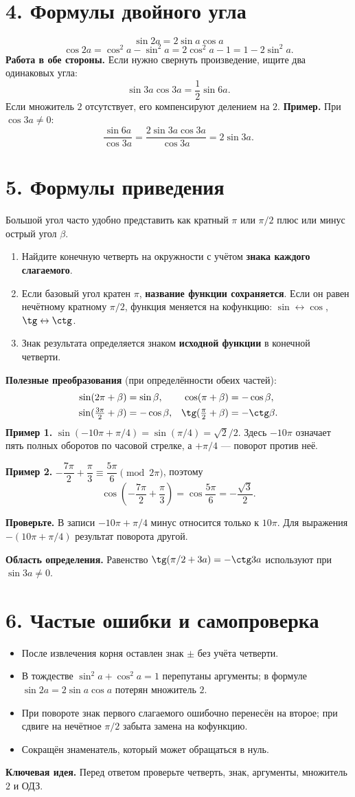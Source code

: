 \documentclass[a4paper,12pt]{article}
\newcommand{\keyidea}[1]{\par\smallskip\noindent\textcolor{darkaccent}{\textbf{Ключевая идея.}} #1\par\smallskip}
\newcommand{\alertline}[1]{\par\smallskip\noindent\textcolor{darkaccent}{\textbf{Проверьте.}} #1\par\smallskip}
\newcommand{\sectionheading}[1]{\section*{\textcolor{darkaccent}{#1}}}
\begin{document}
\sectionheading{4. Формулы двойного угла}
\[
\boxed{\sin2a=2\sin a\cos a}
\]
\[
\boxed{\cos2a=\cos^2a-\sin^2a
=2\cos^2a-1=1-2\sin^2a.}
\]
\textbf{Работа в обе стороны.} Если нужно свернуть произведение, ищите два одинаковых угла:
\[
\sin3a\cos3a=\frac12\sin6a.
\]
Если множитель $2$ отсутствует, его компенсируют делением на $2$.
\textbf{Пример.} При $\cos3a\ne0$:
\[
\frac{\sin6a}{\cos3a}
=\frac{2\sin3a\cos3a}{\cos3a}=2\sin3a.
\]

\sectionheading{5. Формулы приведения}
Большой угол часто удобно представить как кратный $\pi$ или $\pi/2$ плюс
или минус острый угол $\beta$.
\begin{enumerate}
\item Найдите конечную четверть на окружности с учётом \textbf{знака каждого слагаемого}.
\item Если базовый угол кратен $\pi$, \textbf{название функции сохраняется}.
Если он равен нечётному кратному $\pi/2$, функция меняется на кофункцию:
$\sin\leftrightarrow\cos$, $\tg\leftrightarrow\ctg$.
\item Знак результата определяется знаком \textbf{исходной функции} в конечной четверти.
\end{enumerate}
\textbf{Полезные преобразования} (при определённости обеих частей):
\begin{align*}
\sin(2\pi+\beta)&=\sin\beta,&
\cos(\pi+\beta)&=-\cos\beta,\\
\sin(\tfrac{3\pi}{2}+\beta)&=-\cos\beta,&
\tg(\tfrac\pi2+\beta)&=-\ctg\beta.
\end{align*}
\textbf{Пример 1.} $\sin(-10\pi+\pi/4)=\sin(\pi/4)=\sqrt2/2$.
Здесь $-10\pi$ означает пять полных оборотов по часовой стрелке,
а $+\pi/4$ --- поворот против неё.

\textbf{Пример 2.} $-\dfrac{7\pi}{2}+\dfrac\pi3
\equiv\dfrac{5\pi}{6}\pmod{2\pi}$, поэтому
\[
\cos\left(-\frac{7\pi}{2}+\frac\pi3\right)
=\cos\frac{5\pi}{6}=-\frac{\sqrt3}{2}.
\]
\alertline{В записи $-10\pi+\pi/4$ минус относится только к $10\pi$.
Для выражения $-(10\pi+\pi/4)$ результат поворота другой.}
\textbf{Область определения.} Равенство
$\tg(\pi/2+3a)=-\ctg3a$
используют при $\sin3a\ne0$.

\sectionheading{6. Частые ошибки и самопроверка}
\begin{itemize}[itemsep=0pt,topsep=0pt]
\item После извлечения корня оставлен знак $\pm$ без учёта четверти.
\item В тождестве $\sin^2a+\cos^2a=1$ перепутаны аргументы;
в формуле $\sin2a=2\sin a\cos a$ потерян множитель $2$.
\item При повороте знак первого слагаемого ошибочно перенесён на второе;
при сдвиге на нечётное $\pi/2$ забыта замена на кофункцию.
\item Сокращён знаменатель, который может обращаться в нуль.
\end{itemize}
\keyidea{Перед ответом проверьте четверть, знак, аргументы, множитель $2$ и ОДЗ.}
\end{document}

